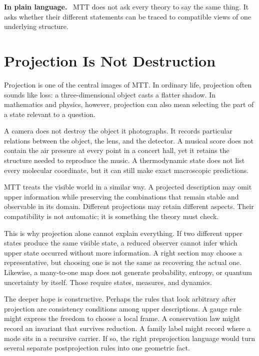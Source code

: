\documentclass[11pt,openany]{book}
\newenvironment{plainsummary}
  {\par\small\noindent\textbf{In plain language.}\ }
  {\par}
\begin{document}
\begin{plainsummary}
MTT does not ask every theory to say the same thing. It asks whether their
different statements can be traced to compatible views of one underlying
structure.
\end{plainsummary}

\chapter{Projection Is Not Destruction}

Projection is one of the central images of MTT. In ordinary life, projection
often sounds like loss: a three-dimensional object casts a flatter shadow.
In mathematics and physics, however, projection can also mean selecting the
part of a state relevant to a question.

A camera does not destroy the object it photographs. It records particular
relations between the object, the lens, and the detector. A musical score
does not contain the air pressure at every point in a concert hall, yet it
retains the structure needed to reproduce the music. A thermodynamic state
does not list every molecular coordinate, but it can still make exact
macroscopic predictions.

MTT treats the visible world in a similar way. A projected description may
omit upper information while preserving the combinations that remain stable
and observable in its domain. Different projections may retain different
aspects. Their compatibility is not automatic; it is something the theory
must check.

This is why projection alone cannot explain everything. If two different
upper states produce the same visible state, a reduced observer cannot infer
which upper state occurred without more information. A right section may
choose a representative, but choosing one is not the same as recovering the
actual one. Likewise, a many-to-one map does not generate probability,
entropy, or quantum uncertainty by itself. Those require states, measures,
and dynamics.

The deeper hope is constructive. Perhaps the rules that look arbitrary after
projection are consistency conditions among upper descriptions. A gauge rule
might express the freedom to choose a local frame. A conservation law might
record an invariant that survives reduction. A family label might record
where a mode sits in a recursive carrier. If so, the right preprojection
language would turn several separate postprojection rules into one geometric
fact.
\end{document}
